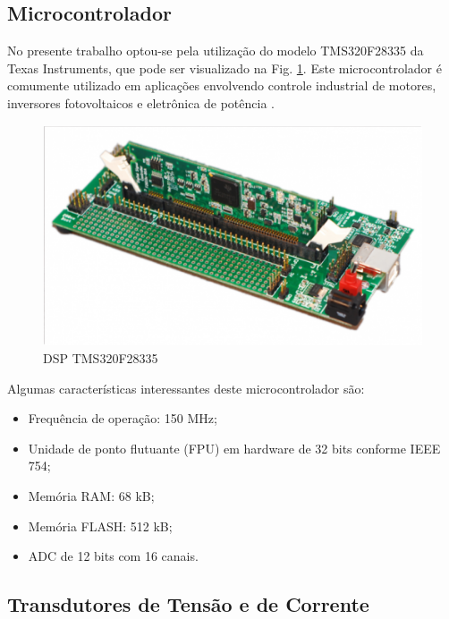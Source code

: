 \subsection{Microcontrolador}

No presente trabalho optou-se pela utilização do modelo TMS320F28335 da Texas Instruments, que pode ser visualizado na Fig. \ref{fig:dsp}.
Este microcontrolador é comumente utilizado em aplicações envolvendo controle industrial de motores, inversores fotovoltaicos e eletrônica de potência \cite{texasinstruments:tms320f28335}.

\begin{figure}[!hbt]
    \begin{center}
    \includegraphics[scale=0.3]{figuras/tms320f28335.png}
    \caption{DSP TMS320F28335}
    \label{fig:dsp}
    \end{center}
\end{figure}

Algumas características interessantes deste microcontrolador são:
\begin{itemize}
    \item Frequência de operação: 150 MHz;
    \item Unidade de ponto flutuante (FPU) em hardware de 32 bits conforme IEEE 754;
    \item Memória RAM: 68 kB;
    \item Memória FLASH: 512 kB;
    \item ADC de 12 bits com 16 canais.
\end{itemize}

\subsection{Transdutores de Tensão e de Corrente}

